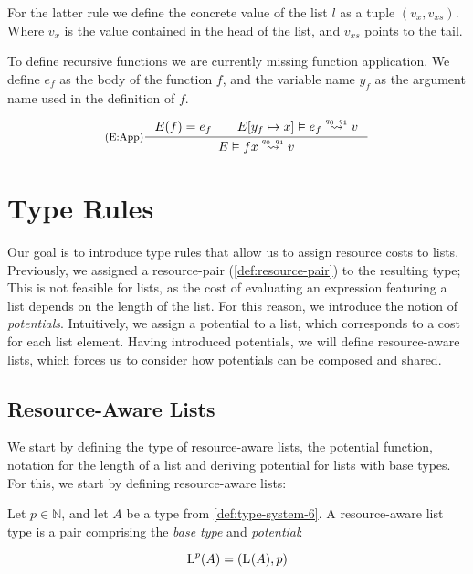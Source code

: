 For the latter rule we define the concrete value of the list \(l\) as a tuple \((v_x, v_{xs})\). Where \(v_x\) is the value contained in the head of the list, and \(v_{xs}\) points to the tail. 

To define recursive functions we are currently missing function application. We define \(e_f\) as the body of the function \(f\), and the variable name \(y_f\) as the argument name used in the definition of \(f\). 

\[
   \inference[(E:App)]
   {E(f) = e_f \qquad \evals{\envaugment{E}{y_f}{x}}{e_f}{v}{q_0}{q_1}}
   {\evals{E}{f x}{v}{q_0}{q_1}}
\]

\section{Type Rules}

Our goal is to introduce type rules that allow us to assign resource costs to lists. Previously, we assigned a resource-pair (\cref{def:resource-pair}) to the resulting type; This is not feasible for lists, as the cost of evaluating an expression featuring a list depends on the length of the list. For this reason, we introduce the notion of \emph{potentials}. Intuitively, we assign a potential to a list, which corresponds to a cost for each list element. Having introduced potentials, we will define resource-aware lists, which forces us to consider how potentials can be composed and shared.

\subsection{Resource-Aware Lists}

We start by defining the type of resource-aware lists, the potential function, notation for the length of a list and deriving potential for lists with base types. For this, we start by defining resource-aware lists:

\begin{definition}\label{def:ra-list}
   Let \(p \in \mathbb{N}\), and let \(A\) be a type from \cref{def:type-system-6}. A resource-aware list type is a pair comprising the \emph{base type} and \emph{potential}:

   \[
      \text{L}^{p}(A) = (\text{L}^{}(A), p)
   \]
\end{definition}

